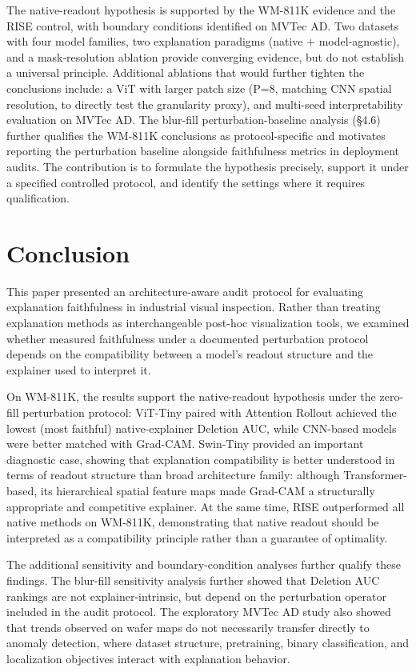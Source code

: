 \documentclass[11pt,a4paper]{article}
\begin{document}
The native-readout hypothesis is supported by the WM-811K evidence and the RISE control, with boundary conditions identified on MVTec AD. Two datasets with four model families, two explanation paradigms (native + model-agnostic), and a mask-resolution ablation provide converging evidence, but do not establish a universal principle. Additional ablations that would further tighten the conclusions include: a ViT with larger patch size (P=8, matching CNN spatial resolution, to directly test the granularity proxy), and multi-seed interpretability evaluation on MVTec AD. The blur-fill perturbation-baseline analysis (\S{}4.6) further qualifies the WM-811K conclusions as protocol-specific and motivates reporting the perturbation baseline alongside faithfulness metrics in deployment audits. The contribution is to formulate the hypothesis precisely, support it under a specified controlled protocol, and identify the settings where it requires qualification.

\section{Conclusion}

This paper presented an architecture-aware audit protocol for evaluating explanation faithfulness in industrial visual inspection. Rather than treating explanation methods as interchangeable post-hoc visualization tools, we examined whether measured faithfulness under a documented perturbation protocol depends on the compatibility between a model's readout structure and the explainer used to interpret it.

On WM-811K, the results support the native-readout hypothesis under the zero-fill perturbation protocol: ViT-Tiny paired with Attention Rollout achieved the lowest (most faithful) native-explainer Deletion AUC, while CNN-based models were better matched with Grad-CAM. Swin-Tiny provided an important diagnostic case, showing that explanation compatibility is better understood in terms of readout structure than broad architecture family: although Transformer-based, its hierarchical spatial feature maps made Grad-CAM a structurally appropriate and competitive explainer. At the same time, RISE outperformed all native methods on WM-811K, demonstrating that native readout should be interpreted as a compatibility principle rather than a guarantee of optimality.

The additional sensitivity and boundary-condition analyses further qualify these findings. The blur-fill sensitivity analysis further showed that Deletion AUC rankings are not explainer-intrinsic, but depend on the perturbation operator included in the audit protocol. The exploratory MVTec AD study also showed that trends observed on wafer maps do not necessarily transfer directly to anomaly detection, where dataset structure, pretraining, binary classification, and localization objectives interact with explanation behavior.
\end{document}
